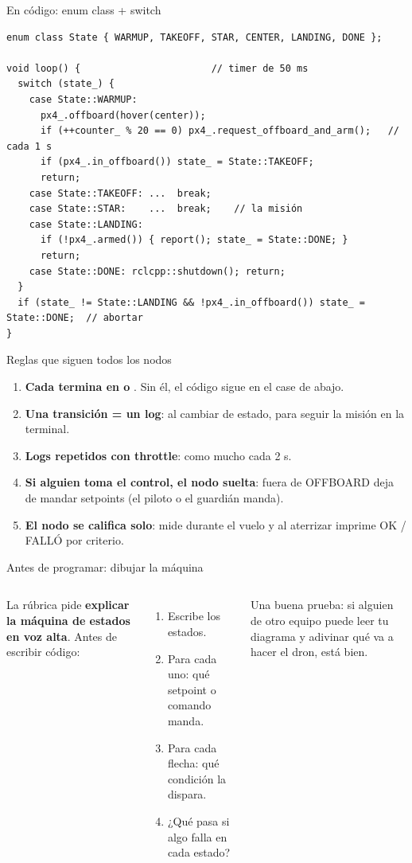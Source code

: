 \begin{frame}[fragile]{En código: enum class + switch}
  \begin{lstlisting}[style=cpp,caption={El esqueleto (simplificado de estrella\_show)}]
enum class State { WARMUP, TAKEOFF, STAR, CENTER, LANDING, DONE };

void loop() {                       // timer de 50 ms
  switch (state_) {
    case State::WARMUP:
      px4_.offboard(hover(center));
      if (++counter_ % 20 == 0) px4_.request_offboard_and_arm();   // cada 1 s
      if (px4_.in_offboard()) state_ = State::TAKEOFF;
      return;
    case State::TAKEOFF: ...  break;
    case State::STAR:    ...  break;    // la misión
    case State::LANDING:
      if (!px4_.armed()) { report(); state_ = State::DONE; }
      return;
    case State::DONE: rclcpp::shutdown(); return;
  }
  if (state_ != State::LANDING && !px4_.in_offboard()) state_ = State::DONE;  // abortar
}
  \end{lstlisting}
\end{frame}

\begin{frame}{Reglas que siguen todos los nodos}
  \begin{enumerate}\small
    \item \textbf{Cada  termina en  o }. Sin él, el código sigue en el case de abajo.
    \item \textbf{Una transición = un log}:  al cambiar de estado, para seguir la misión en la terminal.
    \item \textbf{Logs repetidos con throttle}:  como mucho cada 2 s.
    \item \textbf{Si alguien toma el control, el nodo suelta}: fuera de OFFBOARD deja de mandar setpoints
      (el piloto o el guardián manda).
    \item \textbf{El nodo se califica solo}: mide durante el vuelo y al aterrizar imprime OK / FALLÓ por criterio.
  \end{enumerate}
\end{frame}

\begin{frame}{Antes de programar: dibujar la máquina}
  \begin{columns}[c]
    \small
    La rúbrica pide \textbf{explicar la máquina de estados en voz alta}. Antes de escribir código:
    \begin{enumerate}
      \item Escribe los estados.
      \item Para cada uno: qué setpoint o comando manda.
      \item Para cada flecha: qué condición la dispara.
      \item ¿Qué pasa si algo falla en cada estado?
    \end{enumerate}
    \begin{idea}
      \small Una buena prueba: si alguien de otro equipo puede leer tu diagrama y adivinar qué
      va a hacer el dron, está bien.
    \end{idea}
  \end{columns}
\end{frame}
